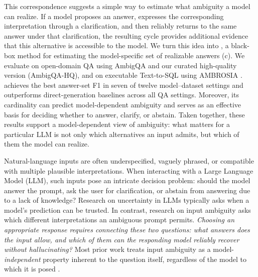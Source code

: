 This correspondence suggests a simple way to estimate what ambiguity a model can realize. If a model proposes an answer, expresses the corresponding interpretation through a clarification, and then reliably returns to the same answer under that clarification, the resulting cycle provides additional evidence that this alternative is accessible to the model. We turn this idea into \circleclar{}, a black-box method for estimating the model-specific set of realizable answers (c). We evaluate \circleclar{} on open-domain QA using AmbigQA \citep{min-etal-2020-ambigqa} and our curated high-quality version (AmbigQA-HQ), and on executable Text-to-SQL using AMBROSIA \citep{NEURIPS2024_a4c942a8}. \circleclar{} achieves the best answer-set F1 in seven of twelve model–dataset settings and outperforms direct-generation baselines across all QA settings. Moreover, its cardinality can predict model-dependent ambiguity and serves as an effective basis for deciding whether to answer, clarify, or abstain. Taken together, these results support a model-dependent view of ambiguity: what matters for a particular LLM is not only which alternatives an input admits, but which of them the model can realize.


\iffalse
Natural-language inputs are often underspecified, vaguely phrased, or compatible with multiple plausible interpretations. When interacting with a Large Language Model (LLM), such inputs pose an intricate decision problem: should the model answer the prompt, ask the user for clarification, or abstain from answering due to a lack of knowledge?
Research on uncertainty in LLMs typically asks when a model's prediction can be trusted. In contrast, research on input ambiguity asks which different interpretations an ambiguous prompt permits. \textit{Choosing an appropriate response requires connecting these two questions: what answers does the input allow, and which of them can the responding model reliably recover without hallucinating?}
%
%
Most prior work treats input ambiguity as a model-\emph{independent} property inherent to the question itself, regardless of the model to which it is posed \citep{min-etal-2020-ambigqa,NEURIPS2024_a4c942a8,cole-etal-2023-selectively, pmlr-v235-hou24b,liu-etal-2023-afraid, kim-etal-2023-tree, saparina2026reasoningintentambiguousrequests}. 

